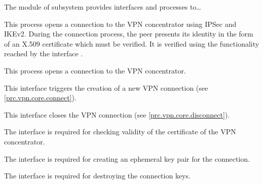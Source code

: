 


The module  of subsystem  provides interfaces and processes to…



This process opens a connection to the VPN concentrator using IPSec and
IKEv2. During the connection process, the peer presents its identity in the form
of an X.509 certificate which must be verified. It is verified using the
functionality reached by the interface .



This process opens a connection to the VPN concentrator.





This interface triggers the creation of a new VPN connection (see \autoref{prc.vpn.core.connect}).


This interface closes the VPN connection (see \autoref{prc.vpn.core.disconnect}).


The interface  is required for checking
validity of the certificate of the VPN concentrator.


The interface  is required for
creating an ephemeral key pair for the connection.


The interface  is required for
destroying the connection keys.


